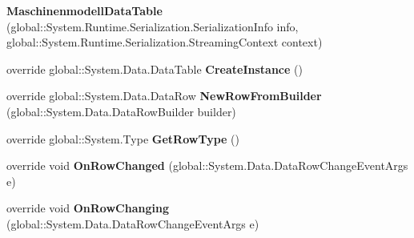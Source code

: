\begin{DoxyCompactItemize}
\item 
{\bfseries Maschinenmodell\+Data\+Table} (global\+::\+System.\+Runtime.\+Serialization.\+Serialization\+Info info, global\+::\+System.\+Runtime.\+Serialization.\+Streaming\+Context context)\hypertarget{class_products_1_1_data_1_1ds_sage_1_1_maschinenmodell_data_table_a7a9696b6c162e4b1d42967177107dd9d}{}\label{class_products_1_1_data_1_1ds_sage_1_1_maschinenmodell_data_table_a7a9696b6c162e4b1d42967177107dd9d}

\item 
override global\+::\+System.\+Data.\+Data\+Table {\bfseries Create\+Instance} ()\hypertarget{class_products_1_1_data_1_1ds_sage_1_1_maschinenmodell_data_table_a29a4567b132ab7116b0eb54c71488460}{}\label{class_products_1_1_data_1_1ds_sage_1_1_maschinenmodell_data_table_a29a4567b132ab7116b0eb54c71488460}

\item 
override global\+::\+System.\+Data.\+Data\+Row {\bfseries New\+Row\+From\+Builder} (global\+::\+System.\+Data.\+Data\+Row\+Builder builder)\hypertarget{class_products_1_1_data_1_1ds_sage_1_1_maschinenmodell_data_table_afbd939fe2452a438c783271ab1be65a2}{}\label{class_products_1_1_data_1_1ds_sage_1_1_maschinenmodell_data_table_afbd939fe2452a438c783271ab1be65a2}

\item 
override global\+::\+System.\+Type {\bfseries Get\+Row\+Type} ()\hypertarget{class_products_1_1_data_1_1ds_sage_1_1_maschinenmodell_data_table_a3d4386ae3af6ef3b840d5aa57af09950}{}\label{class_products_1_1_data_1_1ds_sage_1_1_maschinenmodell_data_table_a3d4386ae3af6ef3b840d5aa57af09950}

\item 
override void {\bfseries On\+Row\+Changed} (global\+::\+System.\+Data.\+Data\+Row\+Change\+Event\+Args e)\hypertarget{class_products_1_1_data_1_1ds_sage_1_1_maschinenmodell_data_table_a487f13270b2adb574dc297b2c854562a}{}\label{class_products_1_1_data_1_1ds_sage_1_1_maschinenmodell_data_table_a487f13270b2adb574dc297b2c854562a}

\item 
override void {\bfseries On\+Row\+Changing} (global\+::\+System.\+Data.\+Data\+Row\+Change\+Event\+Args e)\hypertarget{class_products_1_1_data_1_1ds_sage_1_1_maschinenmodell_data_table_a26965c856d414caffc1b7fd7ee477470}{}\label{class_products_1_1_data_1_1ds_sage_1_1_maschinenmodell_data_table_a26965c856d414caffc1b7fd7ee477470}


\end{DoxyCompactItemize}
